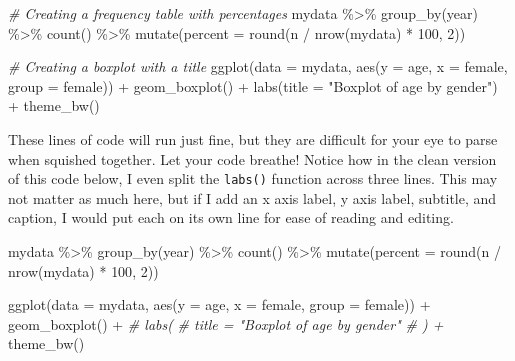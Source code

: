 \documentclass[
]{book}
\newenvironment{Shaded}{\begin{snugshade}}{\end{snugshade}}
\newcommand{\AttributeTok}[1]{\textcolor[rgb]{0.77,0.63,0.00}{#1}}
\newcommand{\CommentTok}[1]{\textcolor[rgb]{0.56,0.35,0.01}{\textit{#1}}}
\newcommand{\DecValTok}[1]{\textcolor[rgb]{0.00,0.00,0.81}{#1}}
\newcommand{\FunctionTok}[1]{\textcolor[rgb]{0.00,0.00,0.00}{#1}}
\newcommand{\NormalTok}[1]{#1}
\newcommand{\SpecialCharTok}[1]{\textcolor[rgb]{0.00,0.00,0.00}{#1}}
\newcommand{\StringTok}[1]{\textcolor[rgb]{0.31,0.60,0.02}{#1}}
\begin{document}
\begin{Shaded}
\begin{Highlighting}[]
\CommentTok{\# Creating a frequency table with percentages }
\NormalTok{mydata }\SpecialCharTok{\%\textgreater{}\%} \FunctionTok{group\_by}\NormalTok{(year) }\SpecialCharTok{\%\textgreater{}\%} \FunctionTok{count}\NormalTok{() }\SpecialCharTok{\%\textgreater{}\%} \FunctionTok{mutate}\NormalTok{(}\AttributeTok{percent =} \FunctionTok{round}\NormalTok{(n }\SpecialCharTok{/} \FunctionTok{nrow}\NormalTok{(mydata) }\SpecialCharTok{*} \DecValTok{100}\NormalTok{, }\DecValTok{2}\NormalTok{))}

\CommentTok{\# Creating a boxplot with a title }
\FunctionTok{ggplot}\NormalTok{(}\AttributeTok{data =}\NormalTok{ mydata, }\FunctionTok{aes}\NormalTok{(}\AttributeTok{y =}\NormalTok{ age, }\AttributeTok{x =}\NormalTok{ female, }\AttributeTok{group =}\NormalTok{ female)) }\SpecialCharTok{+} \FunctionTok{geom\_boxplot}\NormalTok{() }\SpecialCharTok{+} \FunctionTok{labs}\NormalTok{(}\AttributeTok{title =} \StringTok{"Boxplot of age by gender"}\NormalTok{) }\SpecialCharTok{+} \FunctionTok{theme\_bw}\NormalTok{() }
\end{Highlighting}
\end{Shaded}

These lines of code will run just fine, but they are difficult for your eye to parse when squished together. Let your code breathe! Notice how in the clean version of this code below, I even split the \texttt{labs()} function across three lines. This may not matter as much here, but if I add an x axis label, y axis label, subtitle, and caption, I would put each on its own line for ease of reading and editing.

\begin{Shaded}
\begin{Highlighting}[]
\NormalTok{mydata }\SpecialCharTok{\%\textgreater{}\%}
  \FunctionTok{group\_by}\NormalTok{(year) }\SpecialCharTok{\%\textgreater{}\%}
  \FunctionTok{count}\NormalTok{() }\SpecialCharTok{\%\textgreater{}\%}
  \FunctionTok{mutate}\NormalTok{(}\AttributeTok{percent =} \FunctionTok{round}\NormalTok{(n }\SpecialCharTok{/} \FunctionTok{nrow}\NormalTok{(mydata) }\SpecialCharTok{*} \DecValTok{100}\NormalTok{, }\DecValTok{2}\NormalTok{))}

\FunctionTok{ggplot}\NormalTok{(}\AttributeTok{data =}\NormalTok{ mydata, }\FunctionTok{aes}\NormalTok{(}\AttributeTok{y =}\NormalTok{ age, }\AttributeTok{x =}\NormalTok{ female, }\AttributeTok{group =}\NormalTok{ female)) }\SpecialCharTok{+} 
  \FunctionTok{geom\_boxplot}\NormalTok{() }\SpecialCharTok{+} 
  \CommentTok{\# labs(}
  \CommentTok{\#   title = "Boxplot of age by gender"}
  \CommentTok{\# ) + }
  \FunctionTok{theme\_bw}\NormalTok{() }
\end{Highlighting}
\end{Shaded}
\end{document}
